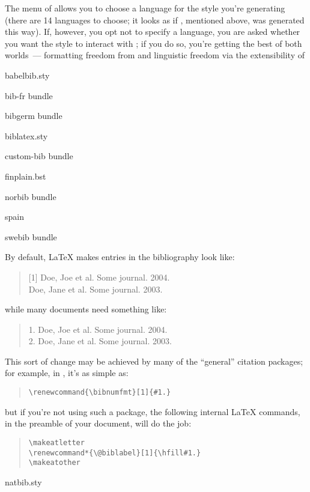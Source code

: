 The  menu of  allows you to
choose a language for the \BibTeX{} style you're generating (there are
14 languages to choose; it looks as if , mentioned
above, was generated this way).  If, however, you opt not to specify a
language, you are asked whether you want the style to interact with
; if you do so, you're getting the best of both
worlds~--- formatting freedom from  and linguistic
freedom via the extensibility of 
\begin{ctanrefs}
\item[babelbib.sty]
\item[bib-fr \nothtml{\rmfamily\upshape}bundle]
\item[bibgerm \nothtml{\rmfamily\upshape}bundle]
\item[biblatex.sty]
\item[custom-bib \nothtml{\rmfamily\upshape}bundle]
\item[finplain.bst]
\item[norbib \nothtml{\rmfamily\upshape}bundle]
\item[spain]
\item[swebib \nothtml{\rmfamily\upshape}bundle]
\end{ctanrefs}


By default, \LaTeX{} makes entries in the bibliography look like:
\begin{quote}
  [1] Doe, Joe et al.  Some journal.  2004.\\
  [2] Doe, Jane et al. Some journal. 2003.
\end{quote}
while many documents need something like:
\begin{quote}
  1. Doe, Joe et al.  Some journal.  2004.\\
  2. Doe, Jane et al. Some journal. 2003.
\end{quote}

This sort of change may be achieved by many of the ``general''
citation packages; for example, in , it's as simple as:
\begin{quote}
\begin{verbatim}
\renewcommand{\bibnumfmt}[1]{#1.}
\end{verbatim}
\end{quote}
but if you're not using such a package, the following internal
\LaTeX{} commands, in the preamble of your document, will do the job:
\begin{quote}
\begin{verbatim}
\makeatletter
\renewcommand*{\@biblabel}[1]{\hfill#1.}
\makeatother
\end{verbatim}
\end{quote}
\begin{ctanrefs}
\item[natbib.sty]
\end{ctanrefs}

